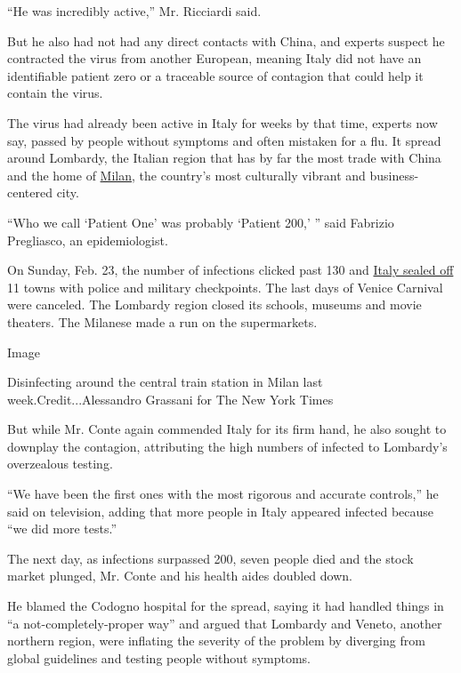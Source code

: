``He was incredibly active,'' Mr. Ricciardi said.

But he also had not had any direct contacts with China, and experts
suspect he contracted the virus from another European, meaning Italy did
not have an identifiable patient zero or a traceable source of contagion
that could help it contain the virus.

The virus had already been active in Italy for weeks by that time,
experts now say, passed by people without symptoms and often mistaken
for a flu. It spread around Lombardy, the Italian region that has by far
the most trade with China and the home of
\href{https://www.nytimes3xbfgragh.onion/2020/02/24/world/europe/24coronavirus-milan-italy.html?searchResultPosition=40}{Milan},
the country's most culturally vibrant and business-centered city.

``Who we call `Patient One' was probably `Patient 200,' '' said Fabrizio
Pregliasco, an epidemiologist.

On Sunday, Feb. 23, the number of infections clicked past 130 and
\href{https://www.nytimes3xbfgragh.onion/2020/02/23/world/europe/italy-coronavirus.html?searchResultPosition=3}{Italy
sealed off} 11 towns with police and military checkpoints. The last days
of Venice Carnival were canceled. The Lombardy region closed its
schools, museums and movie theaters. The Milanese made a run on the
supermarkets.

Image

Disinfecting around the central train station in Milan last
week.Credit...Alessandro Grassani for The New York Times

But while Mr. Conte again commended Italy for its firm hand, he also
sought to downplay the contagion, attributing the high numbers of
infected to Lombardy's overzealous testing.

``We have been the first ones with the most rigorous and accurate
controls,'' he said on television, adding that more people in Italy
appeared infected because ``we did more tests.''

The next day, as infections surpassed 200, seven people died and the
stock market plunged, Mr. Conte and his health aides doubled down.

He blamed the Codogno hospital for the spread, saying it had handled
things in ``a not-completely-proper way'' and argued that Lombardy and
Veneto, another northern region, were inflating the severity of the
problem by diverging from global guidelines and testing people without
symptoms.

